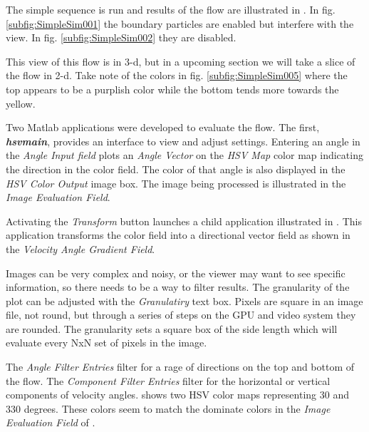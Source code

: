 

The simple sequence is run and results of the flow are illustrated in . In fig. \ref{subfig:SimpleSim001} the boundary particles are enabled but interfere with the view. In fig. \ref{subfig:SimpleSim002} they are disabled. 

This view of this flow is in 3-d, but in a upcoming section we will take a slice of the flow in 2-d. Take note of the colors in fig. \ref{subfig:SimpleSim005} where the top appears to be a purplish color while the bottom tends more towards the yellow.



Two Matlab applications were developed to evaluate the flow. The first, \textit{\textbf{hsvmain}},  provides an interface to view and adjust settings. Entering an angle in the \textit{Angle Input field} plots an \textit{Angle Vector} on the \textit{HSV Map} color map indicating the direction in the color field. The color of that angle is also displayed in the \textit{HSV Color Output} image box. The image being processed is illustrated in the \textit{Image Evaluation Field}.

Activating the \textit{Transform} button launches a child application illustrated in . This application transforms the color field into a directional vector field as shown in the \textit{Velocity Angle Gradient Field}.


Images can be very complex and noisy, or the viewer may want to see specific information, so there needs to be a way to filter results. The granularity of the plot can be adjusted with the \textit{Granulatiry} text box. Pixels are square in an image file, not round, but through a series of steps on the GPU and video system they are rounded. The granularity sets a square box of the side length which will evaluate every NxN set of pixels in the image. 



The \textit{Angle Filter Entries} filter for a rage of directions on the top and bottom of the flow. The \textit{Component Filter Entries} filter for the horizontal or vertical components of velocity angles.
 shows two HSV color maps representing 30 and 330 degrees. These colors seem to match the dominate colors in the \textit{Image Evaluation Field} of . 


